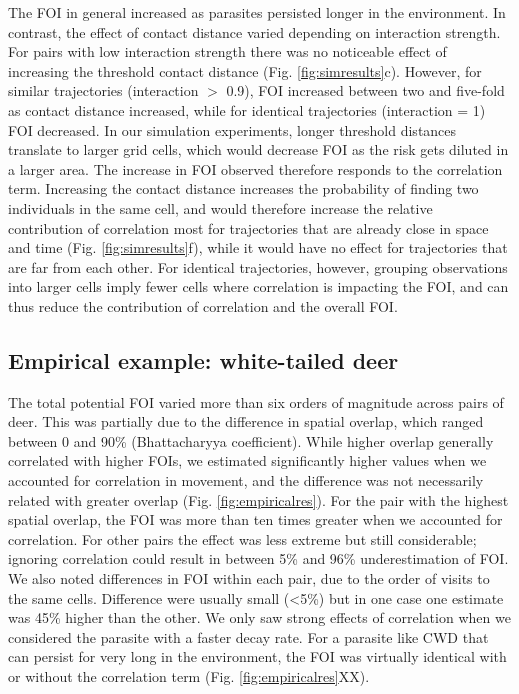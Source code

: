 \documentclass[letterpaper]{article}
\begin{document}
The FOI in general increased as parasites persisted longer in the environment. In contrast, the effect of contact distance varied depending on interaction strength. For pairs with low interaction strength there was no noticeable effect of increasing the threshold contact distance (Fig. \ref{fig:simresults}c). However, for similar trajectories (interaction $>$ 0.9), FOI increased between two and five-fold as contact distance increased, while for identical trajectories (interaction = 1) FOI decreased. 
In our simulation experiments, longer threshold distances translate to larger grid cells, which would decrease FOI as the risk gets diluted in a larger area. The increase in FOI observed therefore responds to the correlation term. Increasing the contact distance increases the probability of finding two individuals in the same cell, and would therefore increase the relative contribution of correlation most for trajectories that are already close in space and time (Fig. \ref{fig:simresults}f), while it would have no effect for trajectories that are far from each other. For identical trajectories, however, grouping observations into larger cells imply fewer cells where correlation is impacting the FOI, and can thus reduce the contribution of correlation and the overall FOI. 

\subsection*{Empirical example: white-tailed deer}

The total potential FOI varied more than six orders of magnitude across pairs of deer. This was partially due to the difference in spatial overlap, which ranged between 0 and 90\% (Bhattacharyya coefficient). While higher overlap generally correlated with higher FOIs, we estimated significantly higher values when we accounted for correlation in movement, and the difference was not necessarily related with greater overlap (Fig. \ref{fig:empiricalres}). For the pair with the highest spatial overlap, the FOI was more than ten times greater when we accounted for correlation. For other pairs the effect was less extreme but still considerable; ignoring correlation could result in between 5\% and 96\% underestimation of FOI. 
We also noted differences in FOI within each pair, due to the order of visits to the same cells. Difference were usually small (<5\%) but in one case one estimate was 45\% higher than the other.
We only saw strong effects of correlation when we considered the parasite with a faster decay rate. For a parasite like CWD that can persist for very long in the environment, the FOI was virtually identical with or without the correlation term (Fig. \ref{fig:empiricalres}XX). 
\end{document}
